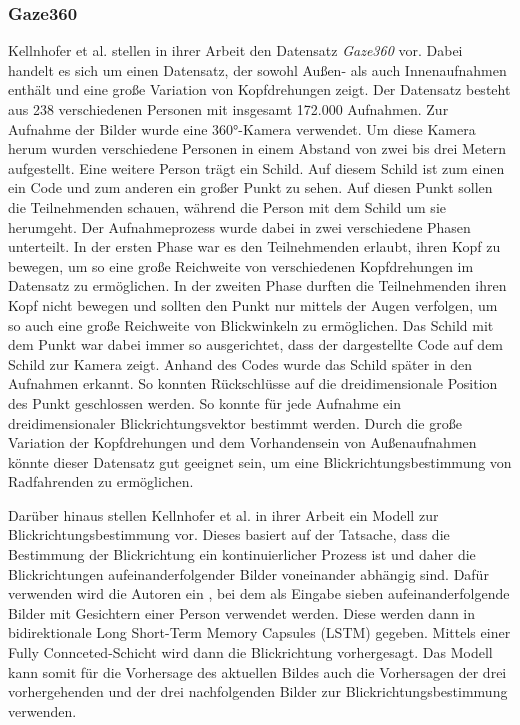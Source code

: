 \subsubsection{Gaze360}\label{sec:related:gaze:appearance:gaze360}

Kellnhofer et al. stellen in ihrer Arbeit \cite{paper:gaze360} den Datensatz \textit{Gaze360} vor. Dabei handelt es sich um einen Datensatz, der sowohl Außen- als auch Innenaufnahmen enthält und eine große Variation von Kopfdrehungen zeigt. Der Datensatz besteht aus 238 verschiedenen Personen mit insgesamt 172.000 Aufnahmen. Zur Aufnahme der Bilder wurde eine 360°-Kamera verwendet. Um diese Kamera herum wurden verschiedene Personen in einem Abstand von zwei bis drei Metern aufgestellt. Eine weitere Person trägt ein Schild. Auf diesem Schild ist zum einen ein Code \cite{paper:april-tag} und zum anderen ein großer Punkt zu sehen. Auf diesen Punkt sollen die Teilnehmenden schauen, während die Person mit dem Schild um sie herumgeht. Der Aufnahmeprozess wurde dabei in zwei verschiedene Phasen unterteilt. In der ersten Phase war es den Teilnehmenden erlaubt, ihren Kopf zu bewegen, um so eine große Reichweite von verschiedenen Kopfdrehungen im Datensatz zu ermöglichen. In der zweiten Phase durften die Teilnehmenden ihren Kopf nicht bewegen und sollten den Punkt nur mittels der Augen verfolgen, um so auch eine große Reichweite von Blickwinkeln zu ermöglichen. Das Schild mit dem Punkt war dabei immer so ausgerichtet, dass der dargestellte Code auf dem Schild zur Kamera zeigt. Anhand des Codes wurde das Schild später in den Aufnahmen erkannt. So konnten Rückschlüsse auf die dreidimensionale Position des Punkt geschlossen werden. So konnte für jede Aufnahme ein dreidimensionaler Blickrichtungsvektor bestimmt werden. 
Durch die große Variation der Kopfdrehungen und dem Vorhandensein von Außenaufnahmen könnte dieser Datensatz gut geeignet sein, um eine Blickrichtungsbestimmung von Radfahrenden zu ermöglichen.

Darüber hinaus stellen Kellnhofer et al. in ihrer Arbeit  \cite{paper:gaze360} ein Modell zur Blickrichtungsbestimmung vor. Dieses basiert auf der Tatsache, dass die Bestimmung der Blickrichtung ein kontinuierlicher Prozess ist und daher die Blickrichtungen aufeinanderfolgender Bilder voneinander abhängig sind. Dafür verwenden wird die Autoren ein \cnn, bei dem als Eingabe sieben aufeinanderfolgende Bilder mit Gesichtern einer Person verwendet werden. Diese werden dann in bidirektionale Long Short-Term Memory Capsules (LSTM) \cite{paper:lstm} gegeben. Mittels einer Fully Connceted-Schicht wird dann die Blickrichtung vorhergesagt. Das Modell kann somit für die Vorhersage des aktuellen Bildes auch die Vorhersagen der drei vorhergehenden und der drei nachfolgenden Bilder zur Blickrichtungsbestimmung verwenden.

